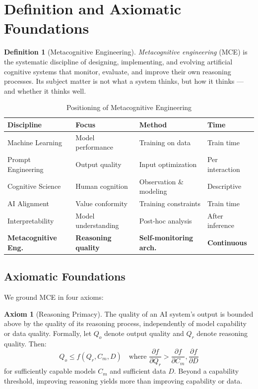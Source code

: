 \documentclass[12pt,a4paper]{article}
\theoremstyle{plain}
\theoremstyle{definition}
\newtheorem{definition}[theorem]{Definition}
\newtheorem{axiom}[theorem]{Axiom}
\theoremstyle{remark}
\begin{document}
\section{Definition and Axiomatic Foundations}

\begin{definition}[Metacognitive Engineering]
\emph{Metacognitive engineering} (MCE) is the systematic discipline of designing, implementing, and evolving artificial cognitive systems that monitor, evaluate, and improve their own reasoning processes. Its subject matter is not what a system thinks, but how it thinks --- and whether it thinks well.
\end{definition}

\begin{table}[H]
\centering
\caption{Positioning of Metacognitive Engineering}
\begin{tabular}{@{}llll@{}}
\toprule
\textbf{Discipline} & \textbf{Focus} & \textbf{Method} & \textbf{Time} \\
\midrule
Machine Learning & Model performance & Training on data & Train time \\
Prompt Engineering & Output quality & Input optimization & Per interaction \\
Cognitive Science & Human cognition & Observation \& modeling & Descriptive \\
AI Alignment & Value conformity & Training constraints & Train time \\
Interpretability & Model understanding & Post-hoc analysis & After inference \\
\textbf{Metacognitive Eng.} & \textbf{Reasoning quality} & \textbf{Self-monitoring arch.} & \textbf{Continuous} \\
\bottomrule
\end{tabular}
\end{table}

\subsection{Axiomatic Foundations}

We ground MCE in four axioms:

\begin{axiom}[Reasoning Primacy]
\label{ax:primacy}
The quality of an AI system's output is bounded above by the quality of its reasoning process, independently of model capability or data quality. Formally, let $Q_o$ denote output quality and $Q_r$ denote reasoning quality. Then:
\[
Q_o \leq f(Q_r, C_m, D) \quad \text{where } \frac{\partial f}{\partial Q_r} > \frac{\partial f}{\partial C_m}, \frac{\partial f}{\partial D}
\]
for sufficiently capable models $C_m$ and sufficient data $D$. Beyond a capability threshold, improving reasoning yields more than improving capability or data.
\end{axiom}
\end{document}
